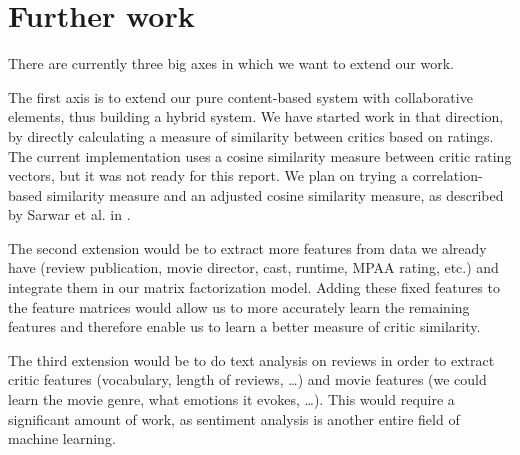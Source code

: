\documentclass[12pt]{article}
\begin{document}
\section{Further work}

There are currently three big axes in which we want to extend our work.

The first axis is to extend our pure content-based system with collaborative elements, thus building a hybrid system. We have started work in that direction, by directly calculating a measure of similarity between critics based on ratings. The current implementation uses a cosine similarity measure between critic rating vectors, but it was not ready for this report. We plan on trying a correlation-based similarity measure and an adjusted cosine similarity measure, as described by Sarwar et al. in \cite{Sarwar01}.

The second extension would be to extract more features from data we already have (review publication, movie director, cast, runtime, MPAA rating, etc.) and integrate them in our matrix factorization model. Adding these fixed features to the feature matrices would allow us to more accurately learn the remaining features and therefore enable us to learn a better measure of critic similarity.

The third extension would be to do text analysis on reviews in order to extract critic features (vocabulary, length of reviews, \dots) and movie features (we could learn the movie genre, what emotions it evokes, \dots). This would require a significant amount of work, as sentiment analysis is another entire field of machine learning.

{}

\end{document}
